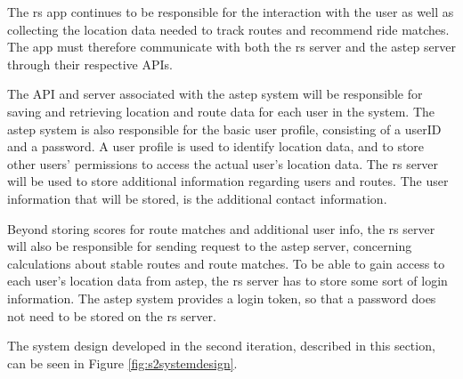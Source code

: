 The \gls{rs} app continues to be responsible for the interaction with the user as well as collecting the location data needed to track routes and recommend ride matches.
The app must therefore communicate with both the \gls{rs} server and the \gls{astep} server through their respective APIs.


The API and server associated with the \gls{astep} system will be responsible for saving and retrieving location and route data for each user in the system.
The \gls{astep} system is also responsible for the basic user profile, consisting of a userID and a password.
A user profile is used to identify location data, and to store other users' permissions to access the actual user's location data.
The \gls{rs} server will be used to store additional information regarding users and routes.
The user information that will be stored, is the additional contact information.

Beyond storing scores for route matches and additional user info, the \gls{rs} server will also be responsible for sending request to the \gls{astep} server, concerning calculations about stable routes and route matches.
To be able to gain access to each user's location data from \gls{astep}, the \gls{rs} server has to store some sort of login information.
The \gls{astep} system provides a login token, so that a password does not need to be stored on the \gls{rs} server.


The system design developed in the second iteration, described in this section, can be seen in Figure \ref{fig:s2systemdesign}.

